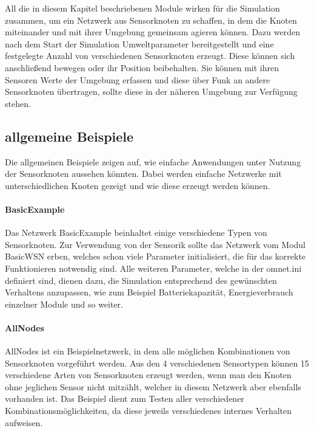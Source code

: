 All die in diesem Kapitel beschriebenen Module wirken für die Simulation zusammen, um ein Netzwerk aus Sensorknoten zu schaffen, in dem die Knoten miteinander und mit ihrer Umgebung gemeinsam agieren können. Dazu werden nach dem Start der Simulation Umweltparameter bereitgestellt und eine festgelegte Anzahl von verschiedenen Sensorknoten erzeugt. Diese können sich anschließend bewegen oder ihr Position beibehalten. Sie können mit ihren Sensoren Werte der Umgebung erfassen und diese über Funk an andere Sensorknoten übertragen, sollte diese in der näheren Umgebung zur Verfügung stehen.

\subsection*{allgemeine Beispiele}

Die allgemeinen Beispiele zeigen auf, wie einfache Anwendungen unter Nutzung der Sensorknoten aussehen könnten. Dabei werden einfache Netzwerke mit unterschiedlichen Knoten gezeigt und wie diese erzeugt werden können.

\paragraph{BasicExample}

Das Netzwerk BasicExample beinhaltet einige verschiedene Typen von Sensorknoten. Zur Verwendung von der Sensorik sollte das Netzwerk vom Modul BasicWSN erben, welches schon viele Parameter initialisiert, die für das korrekte Funktionieren notwendig sind. Alle weiteren Parameter, welche in der omnet.ini definiert sind, dienen dazu, die Simulation entsprechend des gewünschten Verhaltens anzupassen, wie zum Beispiel Batteriekapazität, Energieverbrauch einzelner Module und so weiter.

\paragraph{AllNodes}

AllNodes ist ein Beispielnetzwerk, in dem alle möglichen Kombinationen von Sensorknoten vorgeführt werden. Aus den 4 verschiedenen Sensortypen können 15 verschiedene Arten von Sensorknoten erzeugt werden, wenn man den Knoten ohne jeglichen Sensor nicht mitzählt, welcher in diesem Netzwerk aber ebenfalls vorhanden ist. Das Beispiel dient zum Testen aller verschiedener Kombinationsmöglichkeiten, da diese jeweils verschiedenes internes Verhalten aufweisen.

